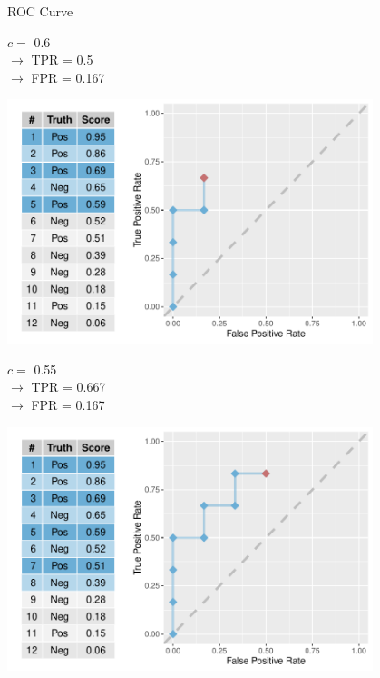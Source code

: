 \documentclass[11pt,compress,t,notes=noshow, xcolor=table]{beamer}
\newenvironment{knitrout}{}{} %
\begin{document}
\begin{vbframe}{ROC Curve}
\begin{knitrout}
{}



\end{knitrout}

$c =$ 0.6\\ 
$\rightarrow$ TPR = 0.5 \\
$\rightarrow$ FPR = 0.167


\framebreak

\begin{knitrout}\scriptsize
{}\color{fgcolor}

{\centering \includegraphics[width=0.8\textwidth]{figure/eval_mclass_roc_sp_9} 

}



\end{knitrout}

$c =$ 0.55\\ 
$\rightarrow$ TPR = 0.667 \\
$\rightarrow$ FPR = 0.167

\framebreak

\begin{knitrout}\scriptsize
{}\color{fgcolor}

{\centering \includegraphics[width=0.8\textwidth]{figure/eval_mclass_roc_sp_10} 

}
\end{knitrout}
\end{vbframe}
\end{document}

